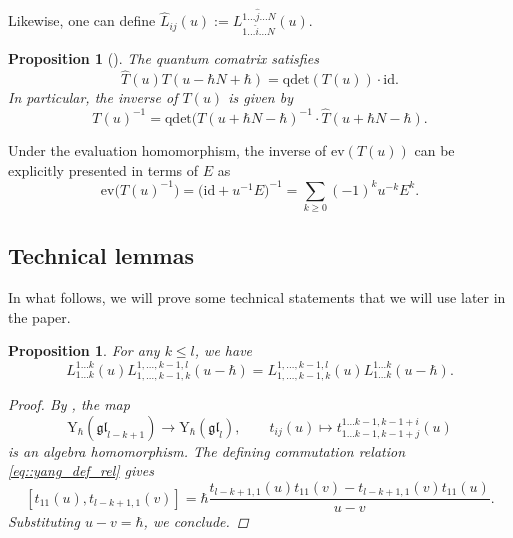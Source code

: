 \documentclass[10pt,a4paper]{article}
\numberwithin{equation}{section}
\newtheorem{Proposition}[Theorem]{Proposition}
{ \theoremstyle{definition}
	\newtheorem{Definition}[Theorem]{Definition}
	\newtheorem{Note}[Theorem]{Note}
	\newtheorem{Example}[Theorem]{Example}
	\newtheorem{Remark}[Theorem]{Remark} }
\newcommand{\rY}{\mathrm{Y}_{\hbar}}
\newcommand{\ev}{\mathrm{ev}}
\newcommand{\id}{\mathrm{id}}
\newcommand{\qdet}{\mathrm{qdet}}
\newcommand{\gl}{\mathfrak{gl}}
\begin{document}
	Likewise, one can define $\hat{L}_{ij}(u) := L_{1\dots \hat{i} \dots N}^{1\dots \hat{j} \dots N}(u)$.
	
	\begin{Proposition}[{\cite[Proposition 1.9.2]{MolevYangians}}]
		\label{prop::inverse_comatrix}
		The quantum comatrix satisfies
		\[
		\hat{T}(u) T(u - \hbar N+ \hbar) = \qdet(T(u))\cdot \id.
		\]
		In particular, the inverse of $T(u)$ is given by
		\[
		T(u)^{-1} = \qdet(T(u+\hbar N - \hbar)^{-1}\cdot \hat{T}(u+\hbar N - \hbar).
		\]
	\end{Proposition}
	
	Under the evaluation homomorphism, the inverse of $\ev(T(u))$ can be explicitly presented in terms of $E$ as
	\begin{equation}
		\label{eq::inverse_series}
		\ev\bigl(T(u)^{-1}\bigr) = \bigl(\id + u^{-1} E\bigr)^{-1} = \sum\limits_{k\geq 0} (-1)^k u^{-k} E^k.
	\end{equation}
	
	\subsection{Technical lemmas} In what follows, we will prove some technical statements that we will use later in the paper.
	
	\begin{Proposition}
		\label{prop::minor_ac_comm}
		For any $k\leq l$, we have
		\begin{equation*}
			L_{1\dots k}^{1\dots k}(u) L_{1,\dots,k-1,k}^{1,\dots,k-1,l}(u-\hbar) = L_{1,\dots,k-1,k}^{1,\dots,k-1,l}(u) L_{1\dots k}^{1\dots k}(u-\hbar).
		\end{equation*}
		\begin{proof}
			By \cite[Theorem 1.12.1]{MolevYangians}, the map
			\begin{equation*}
				\rY(\gl_{l-k+1}) \rightarrow \rY(\gl_{l}), \qquad t_{ij}(u) \mapsto t_{1\dots k-1,k-1+j}^{1\dots k-1,k-1+i}(u)
			\end{equation*}
			is an algebra homomorphism. The defining commutation relation \eqref{eq::yang_def_rel} gives
			\[
			[t_{11}(u),t_{l-k+1,1}(v)] = \hbar \frac{t_{l-k+1,1}(u) t_{11}(v) - t_{l-k+1,1}(v) t_{11}(u)}{u-v}.
			\]
			Substituting $u-v=\hbar$, we conclude.
		\end{proof}
	\end{Proposition}
	
\end{document}
